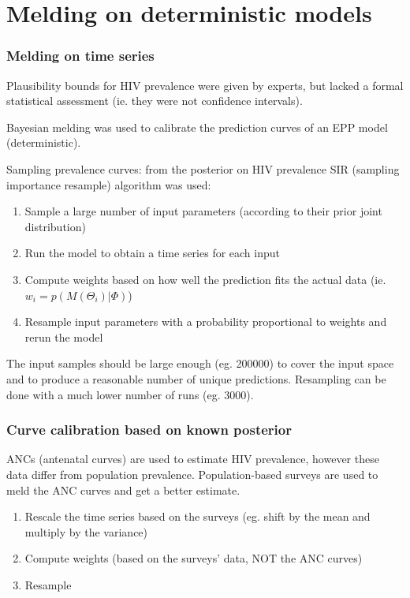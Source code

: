 \documentclass[aspectratio=43]{beamer}
\begin{document}
\section{Melding on deterministic models~}
\begin{frame}
	\frametitle{Melding on time series}
	Plausibility bounds for HIV prevalence were given by experts, but lacked a formal statistical assessment (ie. they were not confidence intervals).
	
	Bayesian melding was used to calibrate the prediction curves of an EPP model (deterministic).
	
	Sampling prevalence curves: from the posterior on HIV prevalence SIR (sampling importance resample) algorithm was used:
	\begin{enumerate}
		\item Sample a large number of input parameters (according to their prior joint distribution)
		\item Run the model to obtain a time series for each input
		\item Compute weights based on how well the prediction fits the actual data (ie. $w_i = p(M(\Theta_i)|\Phi)$)
		\item Resample input parameters with a probability proportional to weights and rerun the model
	\end{enumerate}

	The input samples should be large enough (eg. 200000) to cover the input space and to produce a reasonable number of unique predictions. Resampling can be done with a much lower number of runs (eg. 3000).
	
\end{frame}

\begin{frame}
	\frametitle{Curve calibration based on known posterior}
	ANCs (antenatal curves) are used to estimate HIV prevalence, however these data differ from population prevalence. Population-based surveys are used to meld the ANC curves and get a better estimate.
	
	\begin{enumerate}
		\item Rescale the time series based on the surveys (eg. shift by the mean and multiply by the variance)
		\item Compute weights (based on the surveys' data, NOT the ANC curves)
		\item Resample
	\end{enumerate}
\end{frame}
\end{document}
